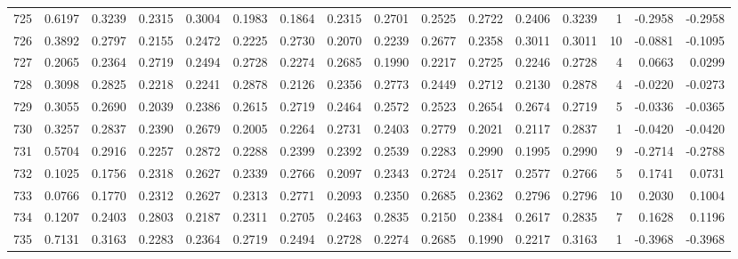 \begin{tabular}{lrrrrrrrrrrrrrrr}
725 &      0.6197 &  0.3239 &  0.2315 &  0.3004 &  0.1983 &  0.1864 &  0.2315 &  0.2701 &  0.2525 &  0.2722 &   0.2406 &     0.3239 &      1 &                   -0.2958 &                    -0.2958 \\
726 &      0.3892 &  0.2797 &  0.2155 &  0.2472 &  0.2225 &  0.2730 &  0.2070 &  0.2239 &  0.2677 &  0.2358 &   0.3011 &     0.3011 &     10 &                   -0.0881 &                    -0.1095 \\
727 &      0.2065 &  0.2364 &  0.2719 &  0.2494 &  0.2728 &  0.2274 &  0.2685 &  0.1990 &  0.2217 &  0.2725 &   0.2246 &     0.2728 &      4 &                    0.0663 &                     0.0299 \\
728 &      0.3098 &  0.2825 &  0.2218 &  0.2241 &  0.2878 &  0.2126 &  0.2356 &  0.2773 &  0.2449 &  0.2712 &   0.2130 &     0.2878 &      4 &                   -0.0220 &                    -0.0273 \\
729 &      0.3055 &  0.2690 &  0.2039 &  0.2386 &  0.2615 &  0.2719 &  0.2464 &  0.2572 &  0.2523 &  0.2654 &   0.2674 &     0.2719 &      5 &                   -0.0336 &                    -0.0365 \\
730 &      0.3257 &  0.2837 &  0.2390 &  0.2679 &  0.2005 &  0.2264 &  0.2731 &  0.2403 &  0.2779 &  0.2021 &   0.2117 &     0.2837 &      1 &                   -0.0420 &                    -0.0420 \\
731 &      0.5704 &  0.2916 &  0.2257 &  0.2872 &  0.2288 &  0.2399 &  0.2392 &  0.2539 &  0.2283 &  0.2990 &   0.1995 &     0.2990 &      9 &                   -0.2714 &                    -0.2788 \\
732 &      0.1025 &  0.1756 &  0.2318 &  0.2627 &  0.2339 &  0.2766 &  0.2097 &  0.2343 &  0.2724 &  0.2517 &   0.2577 &     0.2766 &      5 &                    0.1741 &                     0.0731 \\
733 &      0.0766 &  0.1770 &  0.2312 &  0.2627 &  0.2313 &  0.2771 &  0.2093 &  0.2350 &  0.2685 &  0.2362 &   0.2796 &     0.2796 &     10 &                    0.2030 &                     0.1004 \\
734 &      0.1207 &  0.2403 &  0.2803 &  0.2187 &  0.2311 &  0.2705 &  0.2463 &  0.2835 &  0.2150 &  0.2384 &   0.2617 &     0.2835 &      7 &                    0.1628 &                     0.1196 \\
735 &      0.7131 &  0.3163 &  0.2283 &  0.2364 &  0.2719 &  0.2494 &  0.2728 &  0.2274 &  0.2685 &  0.1990 &   0.2217 &     0.3163 &      1 &                   -0.3968 &                    -0.3968 \\

\end{tabular}
